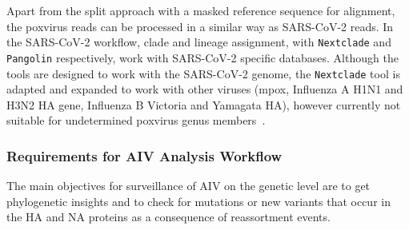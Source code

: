 Apart from the split approach with a masked reference sequence for alignment, the poxvirus reads can be processed in a similar way as \ac{SARS-CoV-2} reads. In the \ac{SARS-CoV-2} workflow, clade and lineage assignment, with \texttt{Nextclade} and \texttt{Pangolin} respectively, work with \ac{SARS-CoV-2} specific databases. Although the tools are designed to work with the \ac{SARS-CoV-2} genome, the \texttt{Nextclade} tool is adapted and expanded to work with other viruses (mpox, Influenza A H1N1 and H3N2 HA gene, Influenza B Victoria and Yamagata HA), however currently not suitable for undetermined poxvirus genus members~\cite{aksamentov2021nextclade}.

\subsubsection{Requirements for AIV Analysis Workflow}
The main objectives for surveillance of \ac{AIV} on the genetic level are to get phylogenetic insights and to check for mutations or new variants that occur in the \ac{HA} and \ac{NA} proteins as a consequence of reassortment events. \\
